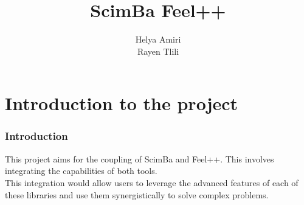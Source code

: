 \documentclass[10pt]{beamer}
\title{ScimBa Feel++}
\author{ Helya Amiri \\ Rayen Tlili }
\date{}
\begin{document}
\frame{\titlepage}
\begin{frame}
    \tableofcontents
\end{frame}



\section{Introduction to the project}
\begin{frame}
\frametitle{Introduction}
This project aims for the coupling of ScimBa and Feel++. This involves integrating the capabilities of both tools. 
\\This integration would allow users to leverage the advanced features of each of these libraries and use them synergistically to solve complex problems.



\end{frame}



\end{document}
